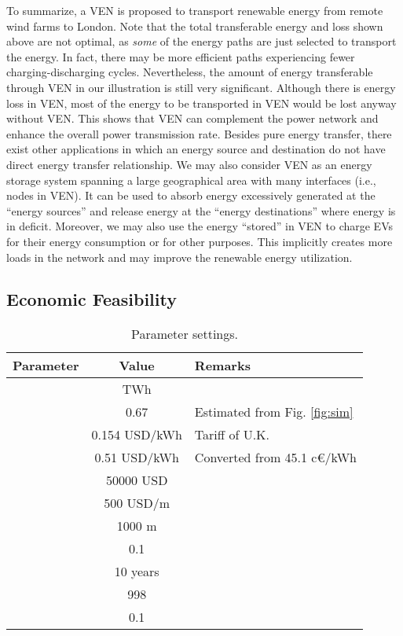 \documentclass[journal]{IEEEtran}
\begin{document}
To summarize, a VEN is proposed to transport renewable energy from remote wind farms to London. Note that the total transferable energy and loss shown above are not optimal, as \textit{some} of the energy paths are just selected to transport the energy. In fact, there may be more efficient paths experiencing fewer charging-discharging cycles. Nevertheless, the amount of energy transferable through VEN in our illustration is still very significant. Although there is energy loss in VEN, most of the  energy to be transported in VEN would be lost anyway without VEN. 
This shows that VEN can complement the power network and enhance the overall power transmission rate.
Besides pure energy transfer, there exist other applications in which an energy source and destination do not have direct energy transfer relationship. We may also consider VEN as an energy storage system spanning a large geographical area with many interfaces (i.e., nodes in VEN). It can be used to absorb energy excessively generated at the ``energy sources'' and release energy at the ``energy destinations'' where energy is in deficit. Moreover, we may also use the energy ``stored'' in VEN to charge EVs for their energy consumption or for other purposes. This implicitly creates more loads in the network and may improve the renewable energy utilization.


\vspace{-0.3cm}
\subsection{Economic Feasibility}


\begin{table}[!t]
\renewcommand{\arraystretch}{1.3}
\caption{Parameter settings.}
\label{tab:parameters}
\centering
\scriptsize
\begin{tabular}{l|c|l}
\hline\hline
Parameter & Value & Remarks\\
\hline
 			&   TWh		& \cite{UKWind}  \\
				&  0.67	 & Estimated from Fig. \ref{fig:sim} 	\\
 	&  0.154	USD/kWh	& Tariff of U.K. \cite{tariff}		\\
 		& 0.51 USD/kWh & Converted from 45.1 c\euro/kWh \cite{storagecost}\\
						& 50000 USD		& \cite{EconDCEV}\\
						& 500 USD/m	& \cite{EconDCEV}\\
					&  1000 m		\\
			&	0.1		\\
 			&	 10	years	\\
								& 998		\\
								&  0.1	\\
\hline\hline
\end{tabular}
\vspace{-0.3cm}
\end{table}
\end{document}

